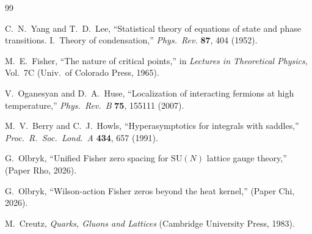 \documentclass[12pt]{article}
\theoremstyle{definition}
\theoremstyle{remark}
\newcommand{\SU}{\mathrm{SU}}
\begin{document}
\begin{thebibliography}{99}

C.~N.~Yang and T.~D.~Lee,
``Statistical theory of equations of state and phase transitions.
I.~Theory of condensation,''
\emph{Phys.\ Rev.} \textbf{87}, 404 (1952).

M.~E.~Fisher,
``The nature of critical points,''
in \emph{Lectures in Theoretical Physics}, Vol.~7C
(Univ.\ of Colorado Press, 1965).

V.~Oganesyan and D.~A.~Huse,
``Localization of interacting fermions at high temperature,''
\emph{Phys.\ Rev.\ B} \textbf{75}, 155111 (2007).

M.~V.~Berry and C.~J.~Howls,
``Hyperasymptotics for integrals with saddles,''
\emph{Proc.\ R.\ Soc.\ Lond.\ A} \textbf{434}, 657 (1991).

G.~Olbryk,
``Unified Fisher zero spacing for $\SU(N)$ lattice gauge theory,''
(Paper Rho, 2026).

G.~Olbryk,
``Wilson-action Fisher zeros beyond the heat kernel,''
(Paper Chi, 2026).

M.~Creutz,
\emph{Quarks, Gluons and Lattices}
(Cambridge University Press, 1983).

\end{thebibliography}
\end{document}
